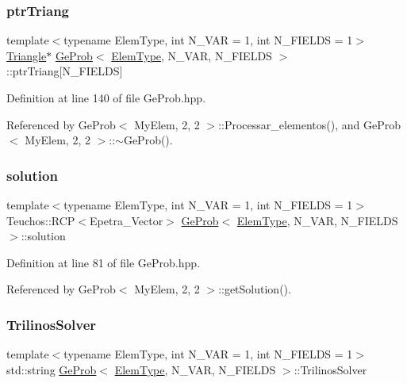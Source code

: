 \subsubsection{\texorpdfstring{ptr\+Triang}{ptrTriang}}
{\footnotesize\ttfamily template$<$typename Elem\+Type, int N\+\_\+\+V\+AR = 1, int N\+\_\+\+F\+I\+E\+L\+DS = 1$>$ \\
\hyperlink{classTriangle}{Triangle}$\ast$ \hyperlink{classGeProb}{Ge\+Prob}$<$ \hyperlink{spectral_8h_aaa2c1a7b2d1b12c590d730fe6ac839fa}{Elem\+Type}, N\+\_\+\+V\+AR, N\+\_\+\+F\+I\+E\+L\+DS $>$\+::ptr\+Triang\mbox{[}N\+\_\+\+F\+I\+E\+L\+DS\mbox{]}\hspace{0.3cm}{\ttfamily [protected]}}



Definition at line 140 of file Ge\+Prob.\+hpp.



Referenced by Ge\+Prob$<$ My\+Elem, 2, 2 $>$\+::\+Processar\+\_\+elementos(), and Ge\+Prob$<$ My\+Elem, 2, 2 $>$\+::$\sim$\+Ge\+Prob().

\mbox{\label{classGeProb_af084ddda2d2d48a332141881d7b22a7d}} 
\subsubsection{\texorpdfstring{solution}{solution}}
{\footnotesize\ttfamily template$<$typename Elem\+Type, int N\+\_\+\+V\+AR = 1, int N\+\_\+\+F\+I\+E\+L\+DS = 1$>$ \\
Teuchos\+::\+R\+CP$<$Epetra\+\_\+\+Vector$>$ \hyperlink{classGeProb}{Ge\+Prob}$<$ \hyperlink{spectral_8h_aaa2c1a7b2d1b12c590d730fe6ac839fa}{Elem\+Type}, N\+\_\+\+V\+AR, N\+\_\+\+F\+I\+E\+L\+DS $>$\+::solution\hspace{0.3cm}{\ttfamily [protected]}}



Definition at line 81 of file Ge\+Prob.\+hpp.



Referenced by Ge\+Prob$<$ My\+Elem, 2, 2 $>$\+::get\+Solution().

\mbox{\label{classGeProb_aac89bac6728a7f42998e0edb80dc835d}} 
\subsubsection{\texorpdfstring{Trilinos\+Solver}{TrilinosSolver}}
{\footnotesize\ttfamily template$<$typename Elem\+Type, int N\+\_\+\+V\+AR = 1, int N\+\_\+\+F\+I\+E\+L\+DS = 1$>$ \\
std\+::string \hyperlink{classGeProb}{Ge\+Prob}$<$ \hyperlink{spectral_8h_aaa2c1a7b2d1b12c590d730fe6ac839fa}{Elem\+Type}, N\+\_\+\+V\+AR, N\+\_\+\+F\+I\+E\+L\+DS $>$\+::Trilinos\+Solver\hspace{0.3cm}{\ttfamily [protected]}}



